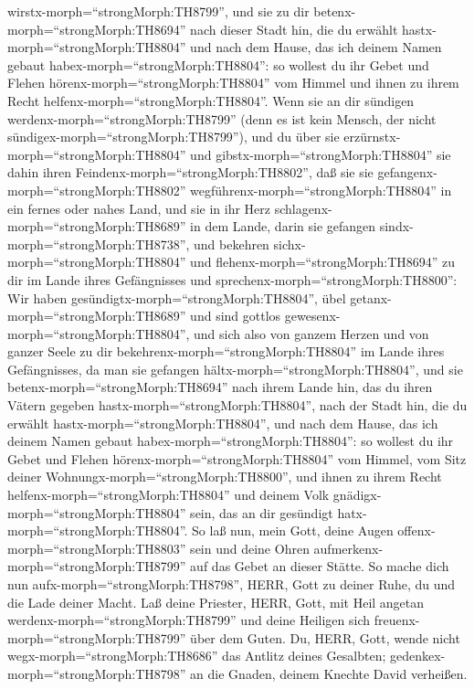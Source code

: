 wirstx-morph=``strongMorph:TH8799'', und sie zu dir
betenx-morph=``strongMorph:TH8694'' nach dieser Stadt hin, die du
erwählt hastx-morph=``strongMorph:TH8804'' und nach dem Hause, das ich
deinem Namen gebaut habex-morph=``strongMorph:TH8804'':  so
wollest du ihr Gebet und Flehen hörenx-morph=``strongMorph:TH8804'' vom
Himmel und ihnen zu ihrem Recht helfenx-morph=``strongMorph:TH8804''.
 Wenn sie an dir sündigen
werdenx-morph=``strongMorph:TH8799'' (denn es ist kein Mensch, der nicht
sündigex-morph=``strongMorph:TH8799''), und du über sie
erzürnstx-morph=``strongMorph:TH8804'' und
gibstx-morph=``strongMorph:TH8804'' sie dahin ihren
Feindenx-morph=``strongMorph:TH8802'', daß sie sie
gefangenx-morph=``strongMorph:TH8802''
wegführenx-morph=``strongMorph:TH8804'' in ein fernes oder nahes Land,
 und sie in ihr Herz schlagenx-morph=``strongMorph:TH8689''
in dem Lande, darin sie gefangen sindx-morph=``strongMorph:TH8738'', und
bekehren sichx-morph=``strongMorph:TH8804'' und
flehenx-morph=``strongMorph:TH8694'' zu dir im Lande ihres Gefängnisses
und sprechenx-morph=``strongMorph:TH8800'': Wir haben
gesündigtx-morph=``strongMorph:TH8804'', übel
getanx-morph=``strongMorph:TH8689'' und sind gottlos
gewesenx-morph=``strongMorph:TH8804'',  und sich also von
ganzem Herzen und von ganzer Seele zu dir
bekehrenx-morph=``strongMorph:TH8804'' im Lande ihres Gefängnisses, da
man sie gefangen hältx-morph=``strongMorph:TH8804'', und sie
betenx-morph=``strongMorph:TH8694'' nach ihrem Lande hin, das du ihren
Vätern gegeben hastx-morph=``strongMorph:TH8804'', nach der Stadt hin,
die du erwählt hastx-morph=``strongMorph:TH8804'', und nach dem Hause,
das ich deinem Namen gebaut habex-morph=``strongMorph:TH8804'':
 so wollest du ihr Gebet und Flehen
hörenx-morph=``strongMorph:TH8804'' vom Himmel, vom Sitz deiner
Wohnungx-morph=``strongMorph:TH8800'', und ihnen zu ihrem Recht
helfenx-morph=``strongMorph:TH8804'' und deinem Volk
gnädigx-morph=``strongMorph:TH8804'' sein, das an dir gesündigt
hatx-morph=``strongMorph:TH8804''.  So laß nun, mein Gott,
deine Augen offenx-morph=``strongMorph:TH8803'' sein und deine Ohren
aufmerkenx-morph=``strongMorph:TH8799'' auf das Gebet an dieser Stätte.
 So mache dich nun aufx-morph=``strongMorph:TH8798'', HERR,
Gott zu deiner Ruhe, du und die Lade deiner Macht. Laß deine Priester,
HERR, Gott, mit Heil angetan werdenx-morph=``strongMorph:TH8799'' und
deine Heiligen sich freuenx-morph=``strongMorph:TH8799'' über dem Guten.
 Du, HERR, Gott, wende nicht
wegx-morph=``strongMorph:TH8686'' das Antlitz deines Gesalbten;
gedenkex-morph=``strongMorph:TH8798'' an die Gnaden, deinem Knechte
David verheißen.

